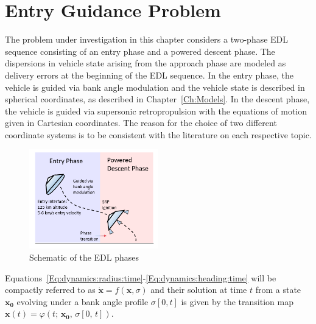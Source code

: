 \section{Entry Guidance Problem}
The problem under investigation in this chapter considers a two-phase EDL sequence consisting of an entry phase and a powered descent phase. The dispersions in vehicle state arising from the approach phase are modeled as delivery errors at the beginning of the EDL sequence. In the entry phase, the vehicle is guided via bank angle modulation and the vehicle state is described in spherical coordinates, as described in Chapter~\ref{Ch:Models}. In the descent phase, the vehicle is guided via supersonic retropropulsion with the equations of motion given in Cartesian coordinates. The reason for the choice of two different coordinate systems is to be consistent with the literature on each respective topic.
\begin{figure}[h!]
	\centering
	\includegraphics[width=0.5\textwidth]{../AAS20/EDLPhaseDiagram} 
	\caption{Schematic of the EDL phases}
	\label{fig_phases}
\end{figure}

Equations~\eqref{Eq:dynamics:radius:time}-\eqref{Eq:dynamics:heading:time} will be compactly referred to as $\dot{\mathbf{x}} = f(\mathbf{x},\sigma)$ and their solution at time $t$ from a state $\mathbf{x_0}$ evolving under a bank angle profile $\sigma[0,t]$ is given by the transition map $\mathbf{x}(t) = \varphi(t;\, \mathbf{x_0},\,\sigma[0,\,t])$.

